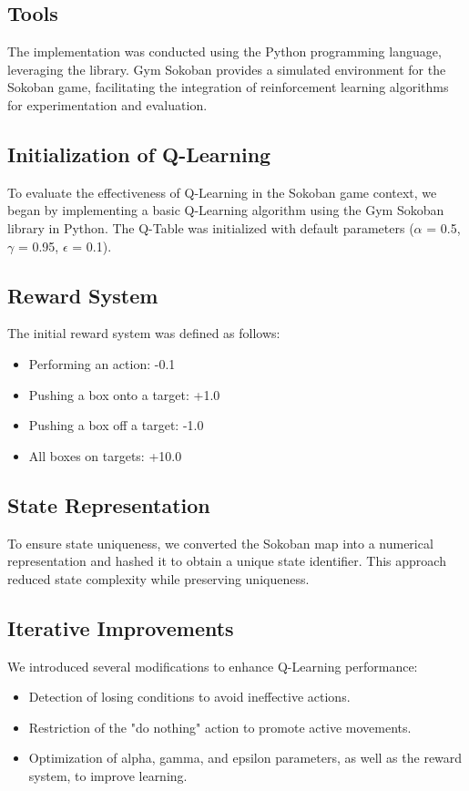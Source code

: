 \documentclass[10pt,twocolumn]{article}
\begin{document}
\subsection{Tools}

The implementation was conducted using the Python programming language, leveraging the \textcite{SchraderSokoban2018} library. Gym Sokoban provides a simulated environment for the Sokoban game, facilitating the integration of reinforcement learning algorithms for experimentation and evaluation.

\subsection{Initialization of Q-Learning}

To evaluate the effectiveness of Q-Learning in the Sokoban game context, we began by implementing a basic Q-Learning algorithm using the Gym Sokoban library in Python. The Q-Table was initialized with default parameters ($\alpha$ = 0.5, $\gamma$ = 0.95, $\epsilon$ = 0.1).

\subsection{Reward System}

The initial reward system was defined as follows:
\begin{itemize}
    \item Performing an action: -0.1
    \item Pushing a box onto a target: +1.0
    \item Pushing a box off a target: -1.0
    \item All boxes on targets: +10.0
\end{itemize}

\subsection{State Representation}

To ensure state uniqueness, we converted the Sokoban map into a numerical representation and hashed it to obtain a unique state identifier. This approach reduced state complexity while preserving uniqueness.

\subsection{Iterative Improvements}

We introduced several modifications to enhance Q-Learning performance:
\begin{itemize}
    \item Detection of losing conditions to avoid ineffective actions.
    \item Restriction of the "do nothing" action to promote active movements.
    \item Optimization of alpha, gamma, and epsilon parameters, as well as the reward system, to improve learning.
\end{itemize}
\end{document}
